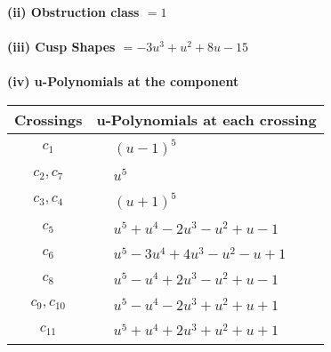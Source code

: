 \documentclass[1p]{elsarticle_modified}
\theoremstyle{definition}
\begin{document}
\flushleft \textbf{(ii) Obstruction class $= 1$}\\~\\
\flushleft \textbf{(iii) Cusp Shapes $= -3 u^3+u^2+8 u-15$}\\~\\
\newpage\renewcommand{\arraystretch}{1}
\flushleft \textbf{(iv) u-Polynomials at the component}\newline \\
\begin{tabular}{m{50pt}|m{274pt}}
Crossings & \hspace{64pt}u-Polynomials at each crossing \\
\hline $$\begin{aligned}c_{1}\end{aligned}$$&$\begin{aligned}
&(u-1)^5
\end{aligned}$\\
\hline $$\begin{aligned}c_{2},c_{7}\end{aligned}$$&$\begin{aligned}
&u^5
\end{aligned}$\\
\hline $$\begin{aligned}c_{3},c_{4}\end{aligned}$$&$\begin{aligned}
&(u+1)^5
\end{aligned}$\\
\hline $$\begin{aligned}c_{5}\end{aligned}$$&$\begin{aligned}
&u^5+u^4-2 u^3- u^2+u-1
\end{aligned}$\\
\hline $$\begin{aligned}c_{6}\end{aligned}$$&$\begin{aligned}
&u^5-3 u^4+4 u^3- u^2- u+1
\end{aligned}$\\
\hline $$\begin{aligned}c_{8}\end{aligned}$$&$\begin{aligned}
&u^5- u^4+2 u^3- u^2+u-1
\end{aligned}$\\
\hline $$\begin{aligned}c_{9},c_{10}\end{aligned}$$&$\begin{aligned}
&u^5- u^4-2 u^3+u^2+u+1
\end{aligned}$\\
\hline $$\begin{aligned}c_{11}\end{aligned}$$&$\begin{aligned}
&u^5+u^4+2 u^3+u^2+u+1
\end{aligned}$\\
\hline
\end{tabular}\\~\\
\end{document}
